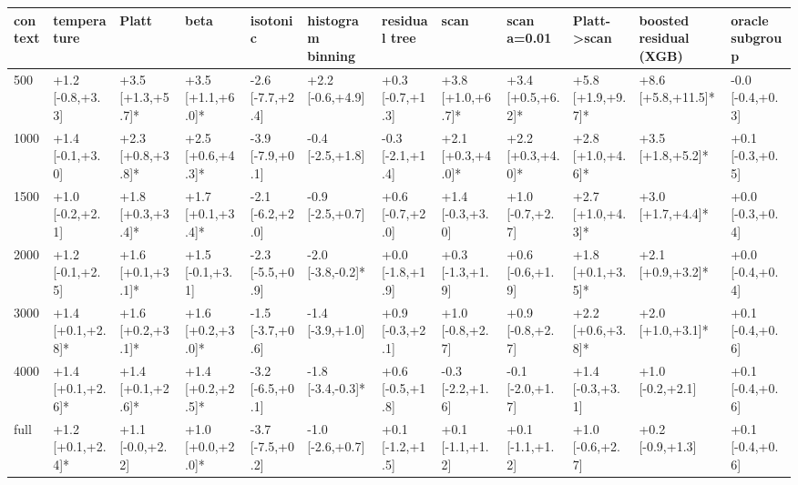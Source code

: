 \begin{tabular}{llllllllllll}
\toprule
context & temperature & Platt & beta & isotonic & histogram binning & residual tree & scan & scan a=0.01 & Platt->scan & boosted residual (XGB) & oracle subgroup \\
\midrule
500 & +1.2 [-0.8,+3.3] & +3.5 [+1.3,+5.7]* & +3.5 [+1.1,+6.0]* & -2.6 [-7.7,+2.4] & +2.2 [-0.6,+4.9] & +0.3 [-0.7,+1.3] & +3.8 [+1.0,+6.7]* & +3.4 [+0.5,+6.2]* & +5.8 [+1.9,+9.7]* & +8.6 [+5.8,+11.5]* & -0.0 [-0.4,+0.3] \\
1000 & +1.4 [-0.1,+3.0] & +2.3 [+0.8,+3.8]* & +2.5 [+0.6,+4.3]* & -3.9 [-7.9,+0.1] & -0.4 [-2.5,+1.8] & -0.3 [-2.1,+1.4] & +2.1 [+0.3,+4.0]* & +2.2 [+0.3,+4.0]* & +2.8 [+1.0,+4.6]* & +3.5 [+1.8,+5.2]* & +0.1 [-0.3,+0.5] \\
1500 & +1.0 [-0.2,+2.1] & +1.8 [+0.3,+3.4]* & +1.7 [+0.1,+3.4]* & -2.1 [-6.2,+2.0] & -0.9 [-2.5,+0.7] & +0.6 [-0.7,+2.0] & +1.4 [-0.3,+3.0] & +1.0 [-0.7,+2.7] & +2.7 [+1.0,+4.3]* & +3.0 [+1.7,+4.4]* & +0.0 [-0.3,+0.4] \\
2000 & +1.2 [-0.1,+2.5] & +1.6 [+0.1,+3.1]* & +1.5 [-0.1,+3.1] & -2.3 [-5.5,+0.9] & -2.0 [-3.8,-0.2]* & +0.0 [-1.8,+1.9] & +0.3 [-1.3,+1.9] & +0.6 [-0.6,+1.9] & +1.8 [+0.1,+3.5]* & +2.1 [+0.9,+3.2]* & +0.0 [-0.4,+0.4] \\
3000 & +1.4 [+0.1,+2.8]* & +1.6 [+0.2,+3.1]* & +1.6 [+0.2,+3.0]* & -1.5 [-3.7,+0.6] & -1.4 [-3.9,+1.0] & +0.9 [-0.3,+2.1] & +1.0 [-0.8,+2.7] & +0.9 [-0.8,+2.7] & +2.2 [+0.6,+3.8]* & +2.0 [+1.0,+3.1]* & +0.1 [-0.4,+0.6] \\
4000 & +1.4 [+0.1,+2.6]* & +1.4 [+0.1,+2.6]* & +1.4 [+0.2,+2.5]* & -3.2 [-6.5,+0.1] & -1.8 [-3.4,-0.3]* & +0.6 [-0.5,+1.8] & -0.3 [-2.2,+1.6] & -0.1 [-2.0,+1.7] & +1.4 [-0.3,+3.1] & +1.0 [-0.2,+2.1] & +0.1 [-0.4,+0.6] \\
full & +1.2 [+0.1,+2.4]* & +1.1 [-0.0,+2.2] & +1.0 [+0.0,+2.0]* & -3.7 [-7.5,+0.2] & -1.0 [-2.6,+0.7] & +0.1 [-1.2,+1.5] & +0.1 [-1.1,+1.2] & +0.1 [-1.1,+1.2] & +1.0 [-0.6,+2.7] & +0.2 [-0.9,+1.3] & +0.1 [-0.4,+0.6] \\
\bottomrule
\end{tabular}
